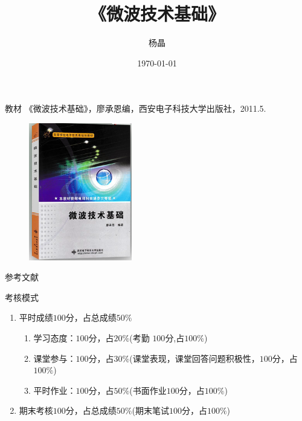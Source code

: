 \documentclass{ctexbeamer}
\begin{document}
\begin{frame}
      \title{《微波技术基础》}
      \author{杨晶}
      \date{\today}
      \titlepage
\end{frame}

\begin{frame}{教材}
      《微波技术基础》，廖承恩编，西安电子科技大学出版社，2011.5.
      \begin{figure}
            \centering
            \includegraphics[height=6cm]{jiaocai2}
      \end{figure}
\end{frame}

\begin{frame}{参考文献}
      
      \nocite{Zhao}
      \nocite{Wu}
      \nocite{Colin}
      \nocite{Liang}
      
\end{frame}

\begin{frame}{考核模式}
      \begin{enumerate}
            \item 平时成绩$100$分，占总成绩$50\%$
                  \begin{enumerate}
                        \item 学习态度：$100$分，占$20\%$(考勤 $100$分,占$100\%$)
                        \item 课堂参与：$100$分，占$30\%$(课堂表现，课堂回答问题积极性，$100$分，占$100\%$)
                        \item 平时作业：$100$分，占$50\%$(书面作业$100$分，占$100\%$)
                  \end{enumerate}
            \item 期末考核$100$分，占总成绩$50\%$(期末笔试$100$分，占$100\%$)
      \end{enumerate}
\end{frame}










\end{document}
